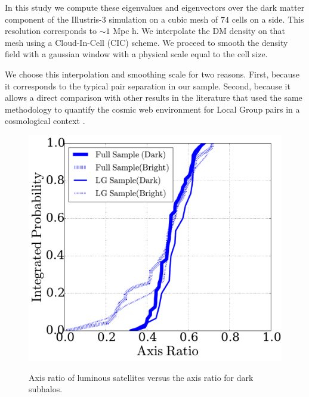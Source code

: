 \documentclass{emulateapj}
\begin{document}
In this study we compute these eigenvalues and eigenvectors over the
dark matter component of the Illustris-3 simulation on a cubic mesh of
$74$ cells on a side. 
This resolution corresponds to $\sim 1$ Mpc h.
We interpolate the DM density on that mesh using a Cloud-In-Cell (CIC)
scheme. 
We proceed to smooth the density field with a gaussian window with a
physical scale equal to the cell size. 

We choose this interpolation and smoothing scale for two reasons.
First, because it corresponds to the typical pair separation in our
sample.
Second, because it allows a direct comparison with other results in
the literature that used the same methodology to quantify the cosmic
web environment for Local Group pairs in a cosmological context
\citep{ForeroRomero2013,2015ApJ...799...45F}.  



\begin{figure}
\centering
\includegraphics[width=\hsize]{axratio_dark_bright.pdf}\\
\caption{Axis ratio of luminous satellites versus the axis ratio for
  dark subhalos.}
\label{fig:StreamPlaneOrbit}
\end{figure}
\end{document}

